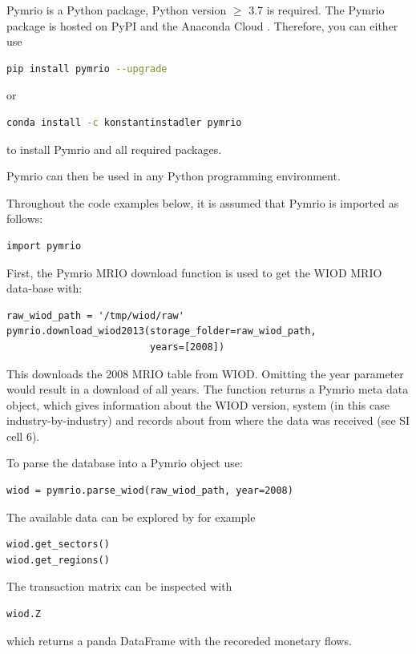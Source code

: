 \documentclass{jors}
\begin{document}
Pymrio is a Python \cite{python2018_Official} package, Python version  $\geq$ 3.7 is required.
The Pymrio package is hosted on PyPI  \cite{pypi2018_PyPI}  and the Anaconda Cloud \cite{anacondainc.2018_Anaconda}.
Therefore, you can either use
\begin{lstlisting}[language=Bash]
pip install pymrio --upgrade
\end{lstlisting}
or
\begin{lstlisting}[language=Bash]
conda install -c konstantinstadler pymrio
\end{lstlisting}

to install Pymrio and all required packages.

Pymrio can then be used in any Python programming environment.

Throughout the code examples below, it is assumed that Pymrio is imported as follows: 

\begin{lstlisting}
import pymrio
\end{lstlisting}

First, the Pymrio MRIO download function is used to get the WIOD MRIO data-base with:
\begin{lstlisting}
raw_wiod_path = '/tmp/wiod/raw'
pymrio.download_wiod2013(storage_folder=raw_wiod_path,
                         years=[2008])
\end{lstlisting}

This downloads the 2008 MRIO table from WIOD. Omitting the year parameter would result in a download of all years.
The function returns a Pymrio meta data object, which gives information about the WIOD version, system (in this case industry-by-industry) and records about from where the data was received (see SI cell 6).

To parse the database into a Pymrio object use:
\begin{lstlisting}
wiod = pymrio.parse_wiod(raw_wiod_path, year=2008)
\end{lstlisting}

The available data can be explored by for example
\begin{lstlisting}
wiod.get_sectors()
wiod.get_regions()
\end{lstlisting}

The transaction matrix can be inspected with
\begin{lstlisting}
wiod.Z
\end{lstlisting}

which returns a panda DataFrame with the recoreded monetary flows.
\end{document}

